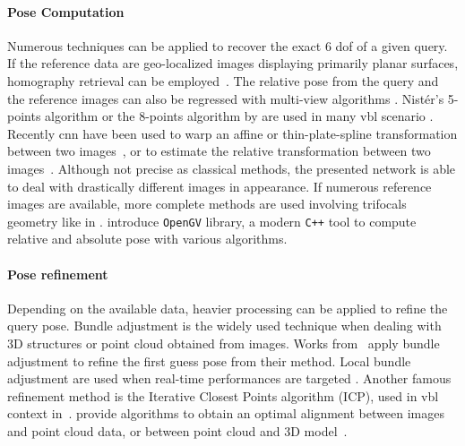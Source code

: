 \paragraph{Pose Computation}
\label{para:pose_compute}
Numerous techniques can be applied to recover the exact 6 \ac{dof} of a given query. If the reference data are geo-localized images displaying primarily planar surfaces, homography retrieval can be employed~\citep{Forstner2016}. The relative pose from the query and the reference images can also be regressed with multi-view algorithms \citep{Hartley2003}. Nist\'er's 5-points algorithm \citep{Nister2004} or the 8-points algorithm by \citet{Hartley1997} are used in many \ac{vbl} scenario \citep{Qu2016}. Recently \ac{cnn} have been used to warp an affine or thin-plate-spline transformation between two images~\citep{Rocco2017}, or to estimate the relative transformation between two images~\citep{Melekhova}. Although not precise as classical methods, the presented network is able to deal with drastically different images in appearance. If numerous reference images are available, more complete methods are used involving trifocals geometry \citep{Hartley2003} like in \citep{Song2016}. \citet{Kneip2014opengv} introduce \texttt{OpenGV} library, a modern \texttt{C++} tool to compute relative and absolute pose with various algorithms.

\paragraph{Pose refinement}
Depending on the available data, heavier processing can be applied to refine the query pose. Bundle adjustment is the widely used technique when dealing with 3D structures or point cloud obtained from images. Works from~\citep{Middelberg2014,Wan2014,Forstner2016} apply bundle adjustment to refine the first guess pose from their method. Local bundle adjustment are used when real-time performances are targeted \citep{Li2010,Qu2016}. Another famous refinement method is the Iterative Closest Points algorithm (ICP), used in \ac{vbl} context in~\citep{Russell2011,Baatz2012,Morago2016}. \citet{Pani2015Lmi} provide algorithms to obtain an optimal alignment between images and point cloud data, or between point cloud and 3D model~\citep{Pani2015Robust}.
